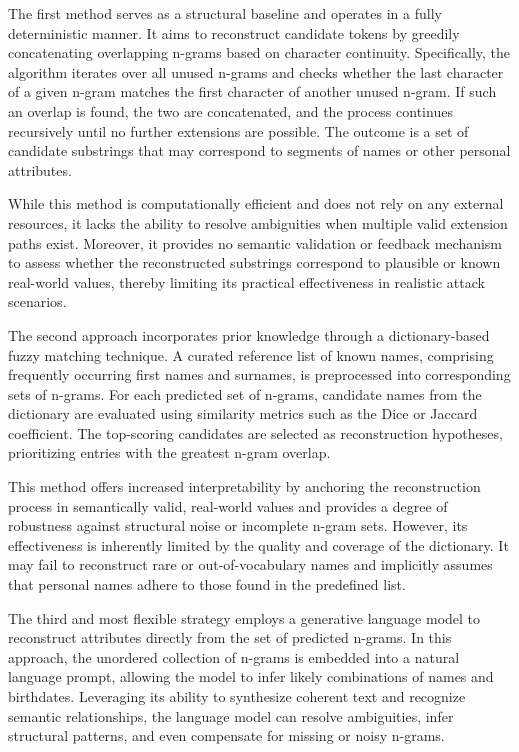 The first method serves as a structural baseline and operates in a fully deterministic manner.
It aims to reconstruct candidate tokens by greedily concatenating overlapping n-grams based on character continuity.
Specifically, the algorithm iterates over all unused n-grams and checks whether the last character of a given n-gram matches the first character of another unused n-gram.
If such an overlap is found, the two are concatenated, and the process continues recursively until no further extensions are possible.
The outcome is a set of candidate substrings that may correspond to segments of names or other personal attributes.

While this method is computationally efficient and does not rely on any external resources, it lacks the ability to resolve ambiguities when multiple valid extension paths exist.
Moreover, it provides no semantic validation or feedback mechanism to assess whether the reconstructed substrings correspond to plausible or known real-world values, thereby limiting its practical effectiveness in realistic attack scenarios.


The second approach incorporates prior knowledge through a dictionary-based fuzzy matching technique.
A curated reference list of known names, comprising frequently occurring first names and surnames, is preprocessed into corresponding sets of n-grams.
For each predicted set of n-grams, candidate names from the dictionary are evaluated using similarity metrics such as the Dice or Jaccard coefficient.
The top-scoring candidates are selected as reconstruction hypotheses, prioritizing entries with the greatest n-gram overlap.

This method offers increased interpretability by anchoring the reconstruction process in semantically valid, real-world values and provides a degree of robustness against structural noise or incomplete n-gram sets.
However, its effectiveness is inherently limited by the quality and coverage of the dictionary.
It may fail to reconstruct rare or out-of-vocabulary names and implicitly assumes that personal names adhere to those found in the predefined list.

The third and most flexible strategy employs a generative language model to reconstruct attributes directly from the set of predicted n-grams.
In this approach, the unordered collection of n-grams is embedded into a natural language prompt, allowing the model to infer likely combinations of names and birthdates.
Leveraging its ability to synthesize coherent text and recognize semantic relationships, the language model can resolve ambiguities, infer structural patterns, and even compensate for missing or noisy n-grams.


